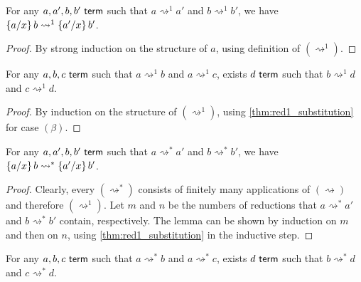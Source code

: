 \documentclass[twoside]{report}
\begin{document}
\begin{proposition}
\label{thm:red1_substitution}
For any $a, a', b, b' \termo$ such that $a \rightsquigarrow^1 a'$ and $b \rightsquigarrow^1 b'$, we have $\subst x a b \rightsquigarrow^1 \subst x {a'} {b'}$.
\end{proposition}

\begin{proof}
By strong induction on the structure of $a$, using definition of $(\rightsquigarrow^1)$.
\end{proof}

\begin{proposition}
\label{thm:red1_confluence}
For any $a,b,c \termo$ such that $a\rightsquigarrow^1 b$ and $a\rightsquigarrow^1 c$, exists $d \termo$ such that $b\rightsquigarrow^1 d$ and $c\rightsquigarrow^1 d$.
\end{proposition}

\begin{proof}
By induction on the structure of $(\rightsquigarrow^1)$, using \cref{thm:red1_substitution} for case $(\beta)$.
\end{proof}

\begin{proposition}
\label{thm:red_substitution}
For any $a, a', b, b' \termo$ such that $a \rightsquigarrow^\ast a'$ and $b \rightsquigarrow^\ast b'$, we have $\subst x a b \rightsquigarrow^\ast \subst x {a'} {b'}$.
\end{proposition}

\begin{proof}
Clearly, every $(\rightsquigarrow^\ast)$ consists of finitely many applications of $(\rightsquigarrow)$ and therefore $(\rightsquigarrow^1)$. Let $m$ and $n$ be the numbers of reductions that $a\rightsquigarrow^\ast a'$ and $b\rightsquigarrow^\ast b'$ contain, respectively. The lemma can be shown by induction on $m$ and then on $n$, using \cref{thm:red1_substitution} in the inductive step.
\end{proof}

\begin{proposition}
\label{thm:red_confluence}
For any $a,b,c \termo$ such that $a\rightsquigarrow^\ast b$ and $a\rightsquigarrow^\ast c$, exists $d \termo$ such that $b\rightsquigarrow^\ast d$ and $c\rightsquigarrow^\ast d$.
\end{proposition}
\end{document}
